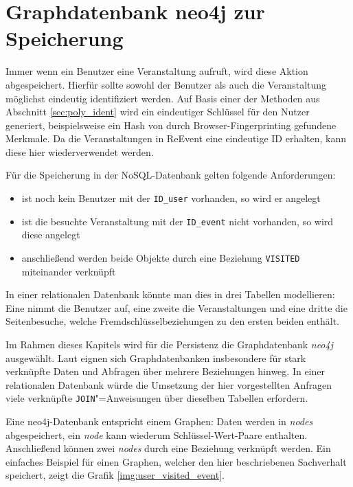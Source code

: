 \section{Graphdatenbank neo4j zur Speicherung}

Immer wenn ein Benutzer eine Veranstaltung aufruft, wird diese Aktion abgespeichert. Hierfür sollte sowohl der Benutzer als auch die Veranstaltung möglichst eindeutig identifiziert werden. Auf Basis einer der Methoden aus Abschnitt \ref{sec:poly_ident} wird ein eindeutiger Schlüssel für den Nutzer generiert, beispielsweise ein Hash von durch Browser-Fingerprinting gefundene Merkmale. Da die Veranstaltungen in ReEvent eine eindeutige ID erhalten, kann diese hier wiederverwendet werden.

Für die Speicherung in der NoSQL-Datenbank gelten folgende Anforderungen:

\begin{itemize}
	\item ist noch kein Benutzer mit der \texttt{ID\_user} vorhanden, so wird er angelegt
	\item ist die besuchte Veranstaltung mit der \texttt{ID\_event} nicht vorhanden, so wird diese angelegt
	\item anschließend werden beide Objekte durch eine Beziehung \texttt{VISITED} miteinander verknüpft
\end{itemize}

In einer relationalen Datenbank könnte man dies in drei Tabellen modellieren: Eine nimmt die Benutzer auf, eine zweite die Veranstaltungen und eine dritte die Seitenbesuche, welche Fremdschlüsselbeziehungen zu den ersten beiden enthält.

Im Rahmen dieses Kapitels wird für die Persistenz die Graphdatenbank \emph{neo4j} ausgewählt. Laut \cite[S. 258f, S. 310]{Redmond.2012} eignen sich Graphdatenbanken insbesondere für stark verknüpfte Daten und Abfragen über mehrere Beziehungen hinweg. In einer relationalen Datenbank würde die Umsetzung der hier vorgestellten Anfragen viele verknüpfte \texttt{JOIN}"=Anweisungen über dieselben Tabellen erfordern.

Eine neo4j-Datenbank entspricht einem Graphen: Daten werden in \emph{nodes} abgespeichert, ein \emph{node} kann wiederum Schlüssel-Wert-Paare enthalten. Anschließend können zwei \emph{nodes} durch eine Beziehung verknüpft werden. Ein einfaches Beispiel für einen Graphen, welcher den hier beschriebenen Sachverhalt speichert, zeigt die Grafik \ref{img:user_visited_event}.

